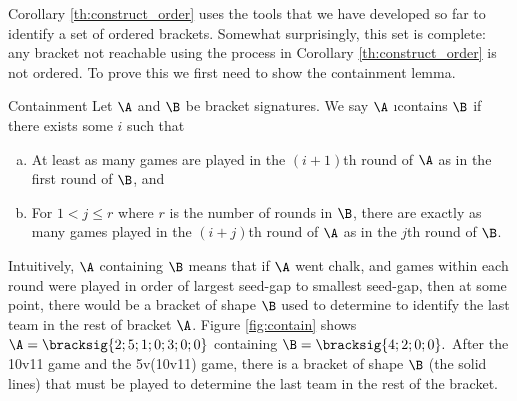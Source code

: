 {    Corollary \ref{th:construct_order} uses the tools that we have developed so far to identify a set of ordered brackets. Somewhat surprisingly, this set is complete: any bracket not reachable using the process in Corollary \ref{th:construct_order} is not ordered. To prove this we first need to show the containment lemma.

    \begin{definition}{Containment}{}
        Let $\A$ and $\B$ be bracket signatures. We say $\A$ \i{contains} $\B$ if there exists some $i$ such that
        \begin{enumerate}[(a)]
            \item At least as many games are played in the $(i+1)$th round of $\A$ as in the first round of $\B$, and
            \item For $1 < j \leq r$ where $r$ is the number of rounds in $\B$, there are exactly as many games played in the $(i + j)$th round of $\A$ as in the $j$th round of $\B$.
        \end{enumerate}
    \end{definition}

    Intuitively, $\A$ containing $\B$ means that if $\A$ went chalk, and games within each round were played in order of largest seed-gap to smallest seed-gap, then at some point, there would be a bracket of shape $\B$ used to determine to identify the last team in the rest of bracket $\A$. Figure \ref{fig:contain} shows $\A = \bracksig{2;5;1;0;3;0;0}$ containing $\B = \bracksig{4;2;0;0}.$ After the 10v11 game and the 5v(10v11) game, there is a bracket of shape $\B$ (the solid lines) that must be played to determine the last team in the rest of the bracket.


    }

